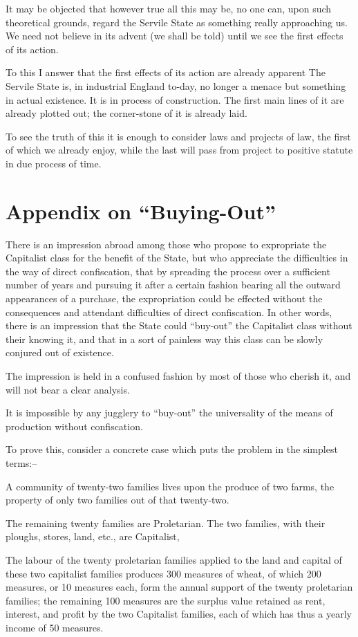 \documentclass{book}
\begin{document}
It may be objected that however true all this may be, no one can, upon such theoretical grounds, regard the Servile State as something really approaching us. We need not believe in its advent (we shall be told) until we see the first effects of its action.

To this I answer that the first effects of its action are already apparent The Servile State is, in industrial England to-day, no longer a menace but something in actual existence. It is in process of construction. The first main lines of it are already plotted out; the corner-stone of it is already laid.

To see the truth of this it is enough to consider laws and projects of law, the first of which we already enjoy, while the last will pass from project to positive statute in due process of time.

\section{Appendix on “Buying-Out”}
There is an impression abroad among those who propose to expropriate the Capitalist class for the benefit of the State, but who appreciate the difficulties in the way of direct confiscation, that by spreading the process over a sufficient number of years and pursuing it after a certain fashion bearing all the outward appearances of a purchase, the expropriation could be effected without the consequences and attendant difficulties of direct confiscation. In other words, there is an impression that the State could “buy-out” the Capitalist class without their knowing it, and that in a sort of painless way this class can be slowly conjured out of existence.

The impression is held in a confused fashion by most of those who cherish it, and will not bear a clear analysis.

It is impossible by any jugglery to “buy-out” the universality of the means of production without confiscation.

To prove this, consider a concrete case which puts the problem in the simplest terms:–

A community of twenty-two families lives upon the produce of two farms, the property of only two families out of that twenty-two.

The remaining twenty families are Proletarian. The two families, with their ploughs, stores, land, etc., are Capitalist,

The labour of the twenty proletarian families applied to the land and capital of these two capitalist families produces 300 measures of wheat, of which 200 measures, or 10 measures each, form the annual support of the twenty proletarian families; the remaining 100 measures are the surplus value retained as rent, interest, and profit by the two Capitalist families, each of which has thus a yearly income of 50 measures.
\end{document}
